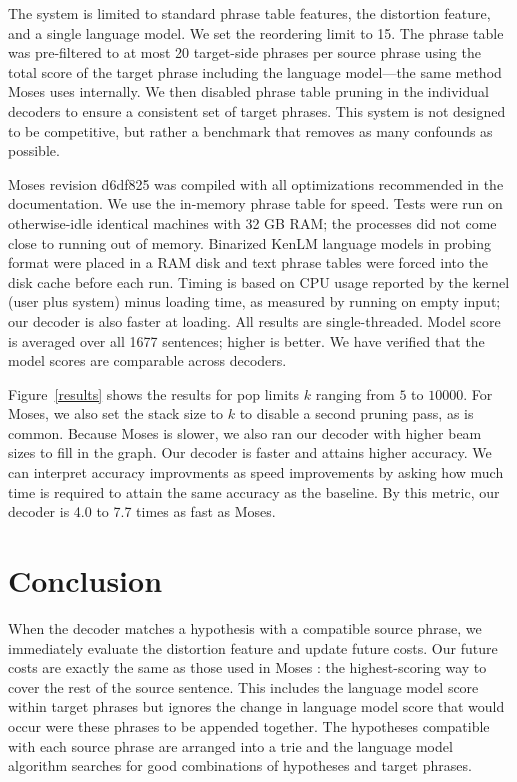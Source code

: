 \documentclass[11pt]{article}
\begin{document}
The system is limited to standard phrase table features, the distortion feature, and a single language model.  We set the reordering limit to 15.   The phrase table was pre-filtered to at most 20 target-side phrases per source phrase using the total score of the target phrase including the language model---the same method Moses uses internally.  We then disabled phrase table pruning in the individual decoders to ensure a consistent set of target phrases.  This system is not designed to be competitive, but rather a benchmark that removes as many confounds as possible.

Moses \cite{moses} revision d6df825 was compiled with all optimizations recommended in the documentation.  We use the in-memory phrase table for speed.  Tests were run on otherwise-idle identical machines with 32 GB RAM; the processes did not come close to running out of memory.  Binarized KenLM language models in probing format were placed in a RAM disk and text phrase tables were forced into the disk cache before each run.  Timing is based on CPU usage reported by the kernel (user plus system) minus loading time, as measured by running on empty input; our decoder is also faster at loading.  All results are single-threaded.  Model score is averaged over all 1677 sentences; higher is better.  We have verified that the model scores are comparable across decoders.  

Figure~\ref{results} shows the results for pop limits $k$ ranging from $5$ to $10000$.  For Moses, we also set the stack size to $k$ to disable a second pruning pass, as is common.  Because Moses is slower, we also ran our decoder with higher beam sizes to fill in the graph.  Our decoder is faster and attains higher accuracy.  We can interpret accuracy improvments as speed improvements by asking how much time is required to attain the same accuracy as the baseline.  By this metric, our decoder is 4.0 to 7.7 times as fast as Moses.  

\section{Conclusion}
When the decoder matches a hypothesis with a compatible source phrase, we immediately evaluate the distortion feature and update future costs.  Our future costs are exactly the same as those used in Moses \cite{moses}: the highest-scoring way to cover the rest of the source sentence.  This includes the language model score within target phrases but ignores the change in language model score that would occur were these phrases to be appended together.  The hypotheses compatible with each source phrase are arranged into a trie and the language model algorithm searches for good combinations of hypotheses and target phrases.




\end{document}
